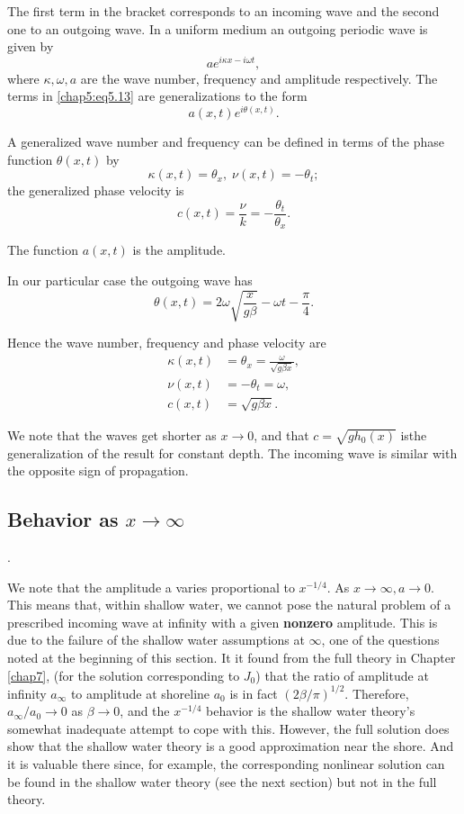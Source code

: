 The first term in the bracket corresponds to an incoming wave and the second one to an outgoing wave. In a uniform medium an outgoing periodic wave is given by 
$$
ae^{i\kappa x-i\omega t},
$$
where $\kappa, \omega, a$ are the wave number, frequency and amplitude respectively. The terms in \eqref{chap5:eq5.13} are generalizations to the form 
$$
a(x,t)e^{i\theta(x,t)}.
$$

A generalized wave number and frequency can be defined in terms of the phase function $\theta(x,t)$ by 
\begin{equation}
\kappa(x,t)=\theta_x,\; \nu(x,t)= -\theta_t;\tag{5.14}\label{chap5:eq5.14}
\end{equation}
the generalized phase velocity is 
\begin{equation}
c(x,t)=\frac{\nu}{k}= -\frac{\theta_t}{\theta_x}.\tag{5.15}\label{chap5:eq5.15}
\end{equation}

The function $a(x,t)$ is the amplitude.

In our particular case the outgoing wave has 
$$
\theta(x,t)=2\omega \sqrt{\frac{x}{g\beta}}-\omega t-\frac{\pi}{4}.
$$

Hence the wave number, frequency and phase velocity are 
\begin{align*}
\kappa(x,t) &=\theta_x=\frac{\omega}{\sqrt{g\beta x}},\\
\nu(x,t) &= -\theta_t=\omega,\\
c(x,t) &= \sqrt{g\beta x}.
\end{align*}

We note that the waves get shorter as $x\to 0$, and that $c=\sqrt{gh_0(x)}$ is\pageoriginale the generalization of the result for constant depth. The incoming wave is similar with the opposite sign of propagation.
\medskip

\subsection*{\bf Behavior as $x\to\infty$}.

We note that the amplitude a varies proportional to $x^{-1/4}$. As $x\to\infty, a\to 0$. This means that, within shallow water, we cannot pose the natural problem of a prescribed incoming wave at infinity with a given {\bf nonzero} amplitude. This is due to the failure of the shallow water assumptions at $\infty$, one of the questions noted at the beginning of this section. It it found from the full theory in Chapter \ref{chap7}, (for the solution corresponding to $J_0$) that the ratio of amplitude at infinity $a_\infty$ to amplitude at shoreline $a_0$ is in fact $(2\beta/\pi)^{1/2}$. Therefore, $a_\infty/a_0\to 0$ as $\beta\to 0$, and the $x^{-1/4}$ behavior is the shallow water theory's somewhat inadequate attempt to cope with this. However, the full solution does show that the shallow water theory is a good approximation near the shore. And it is valuable there since, for example, the corresponding nonlinear solution can be found in the shallow water theory (see the next section) but not in the full theory.

